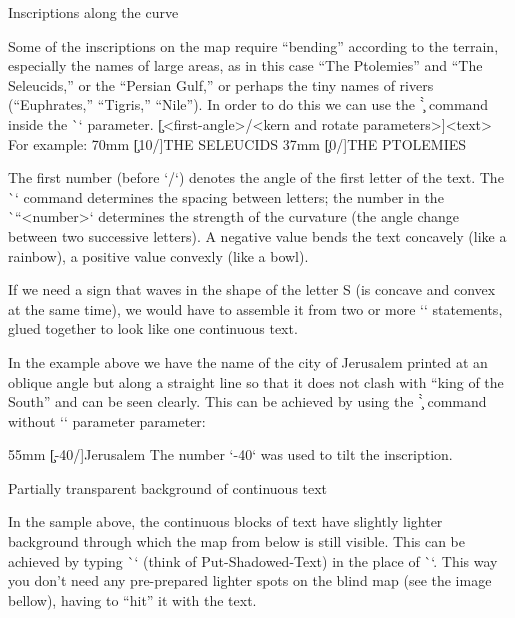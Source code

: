 {{\secc[maptitles] Inscriptions along the curve

Some of the inscriptions on the map require “bending” according to the terrain, especially the 
names of large areas, as in this case  “The Ptolemies” and “The Seleucids,” or the “Persian 
Gulf,” or perhaps the tiny names of rivers (“Euphrates,” “Tigris,” “Nile”). 
In order to do this we can use the \`\c` command inside the \`\puttext` parameter.
\begtt
\c[<first-angle>/<kern and rotate parameters>]{<text>}
\endtt
For example:
\begtt
\puttext 62mm 70mm {\c[10/\kern7pt]{THE SELEUCIDS}}
\puttext 2mm 37mm {\c[0/\kern4pt]{THE PTOLEMIES}}
\endtt

The first number (before `/`) denotes the angle of the first letter of the text.
The \`\kern` command determines the spacing between letters; the number in the \`\pdfrotate``{<number>}` 
determines the strength of the curvature (the angle change between two successive letters). A negative value bends the text concavely 
(like a rainbow), a positive value convexly (like a bowl).

If we need a sign that waves in the shape of the letter S (is concave and convex at 
the same time), we would have to assemble it from two or more `\puttext` statements, glued 
together to look like one continuous text. 


In the example above we have the name of the city of Jerusalem printed at an oblique angle but along a straight line so that it 
does not clash with “king of the South” and can be seen clearly.
This can be achieved by using the \`\c` command without `\pdfrotate` parameter parameter:

\begtt
\puttext 48mm 55mm {\c[-40/\kern1pt]{Jerusalem}}
\endtt
The number `-40` was used to tilt the inscription.


\secc[bkgrnd] Partially transparent background of continuous text

In the sample above, the continuous blocks of text have slightly lighter background through 
which the map from below is still visible.
This can be achieved by typing \`\putstext` (think of Put-Shadowed-Text) in the place of 
\`\puttext`. This way you don't need any pre-prepared lighter spots on the blind map (see the 
image bellow), having to “hit” it with the text. 


\medskip
\centerline{\picw=150pt }

\smallskip

}}
